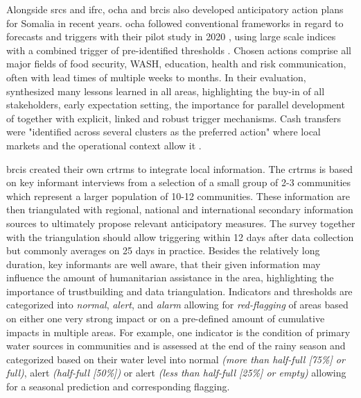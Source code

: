 Alongside \acrshort{srcs} and \acrshort{ifrc}, \acrshort{ocha} and \acrshort{brcis} also developed anticipatory action plans for Somalia in recent years. \acrshort{ocha} followed conventional frameworks in regard to forecasts and triggers with their pilot study in 2020 , using large scale indices with a combined trigger of pre-identified thresholds \autocite{gettliffeOCHAAnticipatoryAction2021,ochaANTICIPATORYACTIONPLAN2020}. Chosen actions comprise all major fields of food security, WASH, education, health and risk communication, often with lead times of multiple weeks to months. In their evaluation, \autocite{gettliffeOCHAAnticipatoryAction2021} synthesized many lessons learned in all areas, highlighting the buy-in of all stakeholders, early expectation setting, the importance for parallel development of  together with explicit, linked and robust trigger mechanisms. Cash transfers were "identified across several clusters as the preferred action" where local markets and the operational context allow it \autocites[21]{gettliffeOCHAAnticipatoryAction2021,ochaANTICIPATORYACTIONPLAN2020}.

\acrshort{brcis} created their own \acrfull{crtrms} to integrate local information. The \acrshort{crtrms} is based on key informant interviews from a selection of a small group of 2-3 communities which represent a larger population of 10-12 communities. These information are then triangulated with regional, national and international secondary information sources to ultimately propose relevant anticipatory measures. The survey together with the triangulation should allow triggering within 12 days after data collection but commonly averages on 25 days in practice. Besides the relatively long duration, key informants are well aware, that their given information may influence the amount of humanitarian assistance in the area, highlighting the importance of trustbuilding and data triangulation\autocite{gualazziniEWEAEarlyWarning2021}.\newline
Indicators and thresholds are categorized into \textit{normal}, \textit{alert}, and \textit{alarm} allowing for \textit{red-flagging} of areas based on either one very strong impact or on a pre-defined amount of cumulative impacts in multiple areas. For example, one indicator is the condition of primary water sources in communities and is assessed at the end of the rainy season and categorized based on their water level into normal \textit{(more than half-full [75\%] or full)}, alert \textit{(half-full [50\%])} or alert \textit{(less than half-full [25\%] or empty)} allowing for a seasonal prediction and corresponding flagging.

